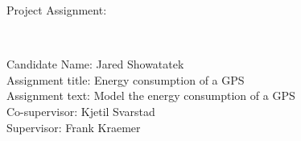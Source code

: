 

\begin{minipage}{\textwidth}
\center\Large{Project Assignment:}\\
\end{minipage}
~\\[2cm]
\begin{minipage}{0.8\textwidth}

	\Large Candidate Name: Jared Showatatek\\ 
	\Large Assignment title: Energy consumption of a GPS\\ 
	\Large Assignment text: Model the energy consumption of a GPS\\
	\Large  Co-supervisor: Kjetil Svarstad\\
	\Large Supervisor: Frank Kraemer\\
	
\end{minipage}